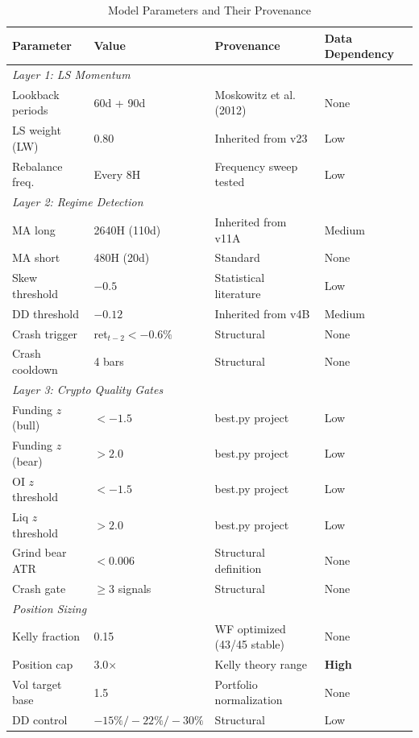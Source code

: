 \begin{table}[htbp]
\centering
\caption{Model Parameters and Their Provenance}
\label{tab:params}
\begin{tabular}{llll}
\toprule
Parameter & Value & Provenance & Data Dependency \\
\midrule
\multicolumn{4}{l}{\textit{Layer 1: LS Momentum}} \\
Lookback periods   & 60d + 90d   & Moskowitz et al. (2012) & None \\
LS weight (LW)     & 0.80        & Inherited from v23      & Low \\
Rebalance freq.    & Every 8H    & Frequency sweep tested  & Low \\
\midrule
\multicolumn{4}{l}{\textit{Layer 2: Regime Detection}} \\
MA long            & 2640H (110d) & Inherited from v11A    & Medium \\
MA short           & 480H (20d)   & Standard               & None \\
Skew threshold     & $-0.5$       & Statistical literature  & Low \\
DD threshold       & $-0.12$      & Inherited from v4B      & Medium \\
Crash trigger      & ret$_{t-2} < -0.6\%$ & Structural     & None \\
Crash cooldown     & 4 bars       & Structural              & None \\
\midrule
\multicolumn{4}{l}{\textit{Layer 3: Crypto Quality Gates}} \\
Funding $z$ (bull) & $< -1.5$     & best.py project        & Low \\
Funding $z$ (bear) & $> 2.0$      & best.py project        & Low \\
OI $z$ threshold   & $< -1.5$     & best.py project        & Low \\
Liq $z$ threshold  & $> 2.0$      & best.py project        & Low \\
Grind bear ATR     & $< 0.006$    & Structural definition  & None \\
Crash gate         & $\geq 3$ signals & Structural          & None \\
\midrule
\multicolumn{4}{l}{\textit{Position Sizing}} \\
Kelly fraction     & 0.15         & WF optimized (43/45 stable) & None \\
Position cap       & 3.0$\times$  & Kelly theory range     & \textbf{High} \\
Vol target base    & 1.5          & Portfolio normalization & None \\
DD control         & $-15\%/-22\%/-30\%$ & Structural       & Low \\
\bottomrule
\end{tabular}
\end{table}

